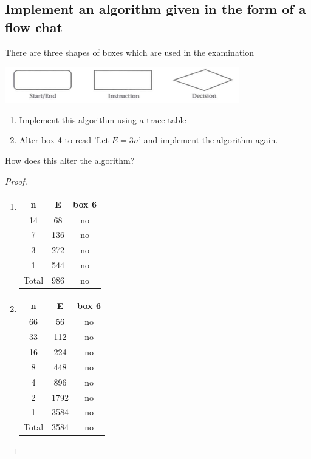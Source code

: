 \documentclass[a4paper]{article}
\begin{document}
\subsection{Implement an algorithm given in the form of a flow chat}
There are three shapes of boxes which are used in the examination\\
\begin{centering}
	\includegraphics{img_D/2.png}
\end{centering}
\begin{eg}
	\vspace{10pt}

	\begin{enumerate}
		\item Implement this algorithm using a trace table
		\item Alter box 4 to read 'Let $E=3n$' and implement the algorithm again.
	\end{enumerate}
	How does this alter the algorithm?

	\begin{proof}

		\begin{enumerate}
			\item \begin{tabular}{|c|c|c|}
				      \hline
				      n     & E   & box 6 \\
				      \hline
				      14    & 68  & no    \\
				      \hline
				      7     & 136 & no    \\
				      \hline
				      3     & 272 & no    \\
				      \hline
				      1     & 544 & no    \\
				      \hline
				      Total & 986 & no    \\
				      \hline
			      \end{tabular}

			\item \begin{tabular}{|c|c|c|}
				      \hline
				      n     & E    & box 6 \\
				      \hline
				      66    & 56   & no    \\
				      \hline
				      33    & 112  & no    \\
				      \hline
				      16    & 224  & no    \\
				      \hline
				      8     & 448  & no    \\
				      \hline
				      4     & 896  & no    \\
				      \hline
				      2     & 1792 & no    \\
				      \hline
				      1     & 3584 & no    \\
				      \hline
				      Total & 3584 & no    \\
				      \hline
			      \end{tabular}


\end{enumerate}
\end{proof}
\end{eg}
\end{document}
